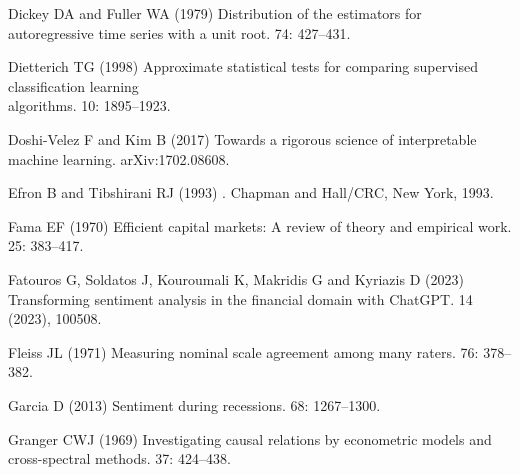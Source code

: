 \documentclass{aims}
\numberwithin{equation}{section}
\begin{document}
\begin{thebibliography}{}
\newblock Dickey DA and Fuller WA (1979)
\newblock Distribution of the estimators for autoregressive time series with a unit root.
 74: 427--431. 
  
\newblock  Dietterich TG (1998)
\newblock Approximate statistical tests for comparing supervised classification learning\\
algorithms.
 10: 1895--1923. 

\newblock Doshi-Velez F and Kim B (2017)
\newblock Towards a rigorous science of interpretable machine learning.
\newblock arXiv:1702.08608. 
  
\newblock Efron B and Tibshirani RJ (1993)
.
\newblock Chapman and Hall/CRC, New York, 1993. 

\newblock Fama EF (1970)
\newblock Efficient capital markets: A review of theory and empirical work.
 25: 383--417. 

\newblock Fatouros G, Soldatos J, Kouroumali K, Makridis G and Kyriazis D (2023)
\newblock Transforming sentiment analysis in the financial domain with
  {ChatGPT}.
 14 (2023), 100508. 

\newblock Fleiss JL (1971)
\newblock Measuring nominal scale agreement among many raters.
 76: 378--382. 

\newblock Garcia D (2013)
\newblock Sentiment during recessions.
 68: 1267--1300. 

\newblock Granger CWJ (1969)
\newblock Investigating causal relations by econometric models and
  cross-spectral methods.
 37: 424--438. 


\end{thebibliography}
\end{document}
